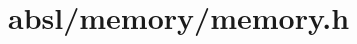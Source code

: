 
\chapter{absl/memory/memory.h}\label{ch:absl-memory-memory.h}
\inputminted{C++}{Google_C++_Style_Guide/asset/absl/memory/memory.h}